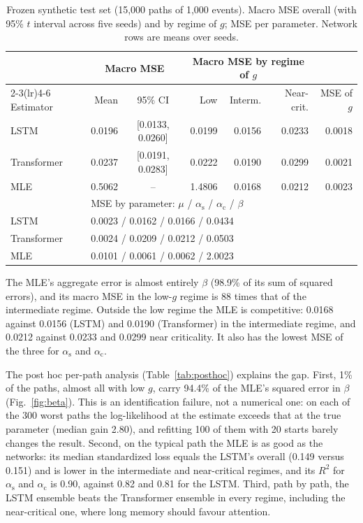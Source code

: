 \documentclass[preprint,12pt,authoryear]{elsarticle}
\newcommand{\aself}{\alpha_{\mathrm{s}}}
\newcommand{\across}{\alpha_{\mathrm{c}}}
\begin{document}
\begin{table}[t]
\centering
\caption{Frozen synthetic test set (15,000 paths of 1,000 events). Macro MSE overall (with
95\% $t$ interval across five seeds) and by regime of $g$; MSE per parameter. Network rows
are means over seeds.}
\label{tab:synthetic}
\small
\setlength{\tabcolsep}{4.5pt}
\begin{tabular}{lrcrrrr}
\toprule
 & \multicolumn{2}{c}{Macro MSE} & \multicolumn{3}{c}{Macro MSE by regime of $g$} & \\
\cmidrule(lr){2-3}\cmidrule(lr){4-6}
Estimator & Mean & 95\% CI & Low & Interm. & Near-crit. & MSE of $g$\\
\midrule
LSTM & 0.0196 & [0.0133, 0.0260] & 0.0199 & 0.0156 & 0.0233 & 0.0018\\
Transformer & 0.0237 & [0.0191, 0.0283] & 0.0222 & 0.0190 & 0.0299 & 0.0021\\
MLE & 0.5062 & -- & 1.4806 & 0.0168 & 0.0212 & 0.0023\\
\midrule
 & \multicolumn{6}{l}{MSE by parameter: $\mu$ / $\aself$ / $\across$ / $\beta$}\\
\midrule
LSTM & \multicolumn{6}{l}{0.0023 / 0.0162 / 0.0166 / 0.0434}\\
Transformer & \multicolumn{6}{l}{0.0024 / 0.0209 / 0.0212 / 0.0503}\\
MLE & \multicolumn{6}{l}{0.0101 / 0.0061 / 0.0062 / 2.0023}\\
\bottomrule
\end{tabular}
\end{table}

The MLE's aggregate error is almost entirely $\beta$ (98.9\% of its sum of squared errors),
and its macro MSE in the low-$g$ regime is 88 times that of the intermediate regime. Outside
the low regime the MLE is competitive: 0.0168 against 0.0156 (LSTM) and 0.0190
(Transformer) in the intermediate regime, and 0.0212 against 0.0233 and 0.0299 near
criticality. It also has the lowest MSE of the three for $\aself$ and $\across$.

The post hoc per-path analysis (Table~\ref{tab:posthoc}) explains the gap. First, 1\% of the
paths, almost all with low $g$, carry 94.4\% of the MLE's squared error in $\beta$
(Fig.~\ref{fig:beta}). This is an identification failure, not a numerical one: on each of the
300 worst paths the log-likelihood at the estimate exceeds that at the true parameter
(median gain 2.80), and refitting 100 of them with 20 starts barely changes the result.
Second, on the typical path the MLE is as good as the networks: its median standardized loss
equals the LSTM's overall (0.149 versus 0.151) and is lower in the intermediate and
near-critical regimes, and its $R^2$ for $\aself$ and $\across$ is 0.90, against 0.82 and
0.81 for the LSTM. Third, path by path, the LSTM ensemble beats the Transformer
ensemble in every regime, including the near-critical one, where long memory should favour
attention.
\end{document}
